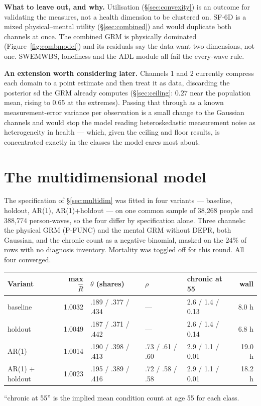 \documentclass[11pt]{article}
\begin{document}
\textbf{What to leave out, and why.} Utilisation (\S\ref{sec:convexity}) is
an outcome for validating the measures, not a health dimension to be
clustered on. SF-6D is a mixed physical--mental utility
(\S\ref{sec:combined}) and would duplicate both channels at once. The
combined GRM is physically dominated (Figure~\ref{fig:combmodel}) and its
residuals say the data want two dimensions, not one. SWEMWBS, loneliness and
the ADL module all fail the every-wave rule.

\textbf{An extension worth considering later.} Channels 1 and 2 currently
compress each domain to a point estimate and then treat it as data, discarding
the posterior sd the GRM already computes (\S\ref{sec:ceiling}: $0.27$ near
the population mean, rising to $0.65$ at the extremes). Passing that through
as a known measurement-error variance per observation is a small change to
the Gaussian channels and would stop the model reading heteroskedastic
measurement noise as heterogeneity in health --- which, given the ceiling and
floor results, is concentrated exactly in the classes the model cares most
about.

\section{The multidimensional model}
\label{sec:multifit}

The specification of \S\ref{sec:multidim} was fitted in four variants ---
baseline, holdout, AR(1), AR(1)+holdout --- on one common sample of 38{,}268
people and 388{,}774 person-waves, so the four differ by specification alone.
Three channels: the physical GRM (P-FUNC) and the mental GRM without DEPR,
both Gaussian, and the chronic count as a negative binomial, masked on the
$24\%$ of rows with no diagnosis inventory. Mortality was toggled off for
this round. All four converged.

\begin{center}\small
\begin{tabular}{lrlllr}
\toprule
Variant & max $\hat R$ & $\theta$ (shares) & $\rho$ & chronic at 55 & wall \\
\midrule
baseline & 1.0032 & .189 / .377 / .434 & --- & 2.6 / 1.4 / 0.13 & 8.0 h \\
holdout & 1.0049 & .187 / .371 / .442 & --- & 2.6 / 1.4 / 0.14 & 6.8 h \\
AR(1) & 1.0014 & .190 / .398 / .413 & .73 / .61 / .60 & 2.9 / 1.1 / 0.01 & 19.0 h \\
AR(1) + holdout & 1.0023 & .195 / .389 / .416 & .72 / .58 / .58 & 2.9 / 1.1 / 0.01 & 18.2 h \\
\bottomrule
\end{tabular}

{\scriptsize ``chronic at 55'' is the implied mean condition count at age 55
for each class.}
\end{center}
\end{document}
